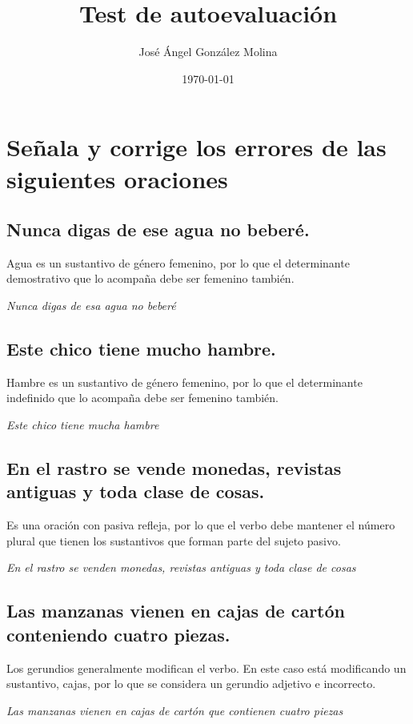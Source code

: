\documentclass[12pt, a4paper, oneside]{report}
\title{Test de autoevaluación}
\author{José Ángel González Molina}
\date{\today}
\begin{document}
    \color{negro}
    \maketitle
    \clearpage

    \chapter*{Señala y corrige los errores de las siguientes oraciones}
    \setcounter{chapter}{1}

    \section{Nunca digas de \color{rojo}ese\color{negro} \;agua no beberé.}
        Agua es un sustantivo de género femenino, por lo que el determinante demostrativo que lo acompaña debe
        ser femenino también.
        \begin{center}
            \textit{Nunca digas de \color{verde}esa\color{negro} \;agua no beberé}
        \end{center}

        \section{Este chico tiene \color{rojo}mucho\color{negro} \;hambre.}
        Hambre es un sustantivo de género femenino, por lo que el determinante indefinido que lo acompaña debe
        ser femenino también.
        \begin{center}
            \textit{Este chico tiene \color{verde}mucha\color{negro} \;hambre}
        \end{center}

        \section{En el rastro se \color{rojo}vende\color{negro} \;monedas, revistas antiguas y toda
        clase de cosas.}
        Es una oración con pasiva refleja, por lo que el verbo debe mantener el número plural que tienen los
        sustantivos que forman parte del sujeto pasivo.
        \begin{center}
            \textit{En el rastro se \color{verde}venden\color{negro} \;monedas, revistas antiguas y
            toda clase de cosas}
        \end{center}

        \section{Las manzanas vienen en cajas de cartón \color{rojo}conteniendo\color{negro} \;cuatro piezas.}
        Los gerundios generalmente modifican el verbo. En este caso está modificando un sustantivo, cajas, por
        lo que se considera un gerundio adjetivo e incorrecto.
        \begin{center}
            \textit{Las manzanas vienen en cajas de cartón \color{verde}que contienen\color{negro}
            \;cuatro piezas}
        \end{center}
\end{document}
